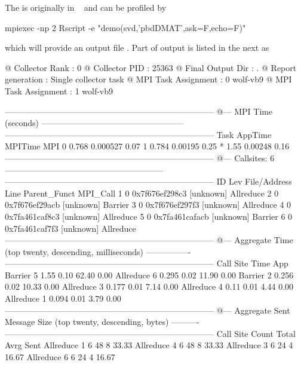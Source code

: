 The  is originally in
~\citep{Schmidt2012pbdBASEpackage}
and can be profiled by
\begin{Code}
mpiexec -np 2 Rscript -e "demo(svd,'pbdDMAT',ask=F,echo=F)"
\end{Code}
which will provide an output file .
Part of output is listed in the next as
\begin{Output}
@ Collector Rank           : 0
@ Collector PID            : 25363
@ Final Output Dir         : .
@ Report generation        : Single collector task
@ MPI Task Assignment      : 0 wolf-vb9
@ MPI Task Assignment      : 1 wolf-vb9

---------------------------------------------------------------------------
  @--- MPI Time (seconds) ---------------------------------------------------
  ---------------------------------------------------------------------------
  Task    AppTime    MPITime     MPI%
0      0.768   0.000527     0.07
1      0.784    0.00195     0.25
*       1.55    0.00248     0.16
---------------------------------------------------------------------------
  @--- Callsites: 6 ---------------------------------------------------------
  ---------------------------------------------------------------------------
  ID Lev File/Address        Line Parent_Funct             MPI_Call
1   0 0x7f676ef298c3           [unknown]                Allreduce
2   0 0x7f676ef29acb           [unknown]                Barrier
3   0 0x7f676ef297f3           [unknown]                Allreduce
4   0 0x7fa461caf8c3           [unknown]                Allreduce
5   0 0x7fa461cafacb           [unknown]                Barrier
6   0 0x7fa461caf7f3           [unknown]                Allreduce
---------------------------------------------------------------------------
  @--- Aggregate Time (top twenty, descending, milliseconds) ----------------
  ---------------------------------------------------------------------------
  Call                 Site       Time    App%
Barrier                 5       1.55    0.10   62.40    0.00
Allreduce               6      0.295    0.02   11.90    0.00
Barrier                 2      0.256    0.02   10.33    0.00
Allreduce               3      0.177    0.01    7.14    0.00
Allreduce               4       0.11    0.01    4.44    0.00
Allreduce               1      0.094    0.01    3.79    0.00
---------------------------------------------------------------------------
  @--- Aggregate Sent Message Size (top twenty, descending, bytes) ----------
  ---------------------------------------------------------------------------
  Call                 Site      Count      Total       Avrg  Sent%
Allreduce               1          6         48          8  33.33
Allreduce               4          6         48          8  33.33
Allreduce               3          6         24          4  16.67
Allreduce               6          6         24          4  16.67

\end{Output}

